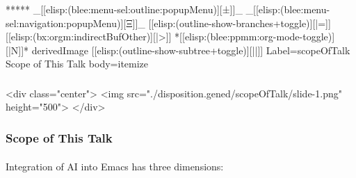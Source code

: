 \begin{whenOrg}
\begin{verblatex}
\begin{frame}[fragile,plain,label=greetings]

\end{frame}
\end{verblatex}



\begin{whenOrg}
*****  _[[elisp:(blee:menu-sel:outline:popupMenu)][±]]_ _[[elisp:(blee:menu-sel:navigation:popupMenu)][Ξ]]_ [[elisp:(outline-show-branches+toggle)][|=]] [[elisp:(bx:orgm:indirectBufOther)][|>]] *[[elisp:(blee:ppmm:org-mode-toggle)][|N]]*  derivedImage [[elisp:(outline-show-subtree+toggle)][||]] Label=scopeOfTalk Scope of This Talk body=itemize
\end{whenOrg}

\begin{htmlonly}

\begin{frame}[fragile,plain,label=scopeOfTalk]
    \frametitle{}
    \framesubtitle{}
    \begin{rawhtml}
<div class="center">
<img src="./disposition.gened/scopeOfTalk/slide-1.png" height="500">
</div>
    \end{rawhtml}
\end{frame}
\end{htmlonly}

\begin{verblatex}

\begin{frame}[fragile,plain,label=scopeOfTalk]
    \frametitle{Scope of This Talk}
    \framesubtitle{}

Integration of AI into Emacs has three dimensions:


\end{frame}
\end{verblatex}
\end{whenOrg}
